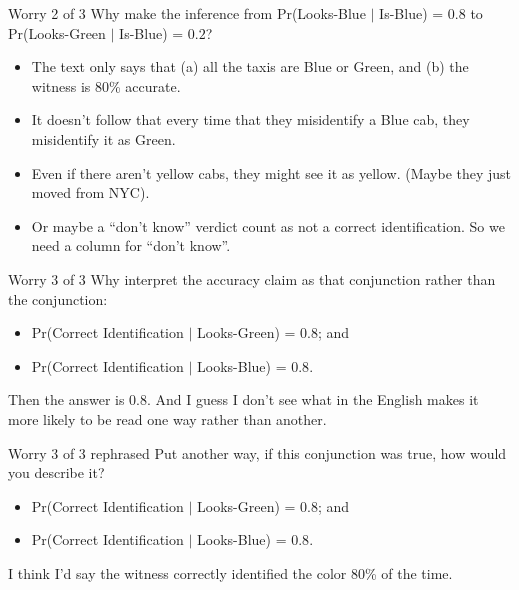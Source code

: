 \documentclass[
  ignorenonframetext,
]{beamer}
\providecommand{\tightlist}{%
  \setlength{\itemsep}{0pt}\setlength{\parskip}{0pt}}
\renewcommand{\,}{\text{, }}
\begin{document}
\begin{frame}{Worry 2 of 3}
\protect\hypertarget{worry-2-of-3}{}
Why make the inference from Pr(Looks-Blue \(|\) Is-Blue) = \(0.8\) to
Pr(Looks-Green \(|\) Is-Blue) = \(0.2\)? \pause

\begin{itemize}
\tightlist
\item
  The text only says that (a) all the taxis are Blue or Green, and (b)
  the witness is 80\% accurate.
\item
  It doesn't follow that every time that they misidentify a Blue cab,
  they misidentify it as Green. \pause
\item
  Even if there aren't yellow cabs, they might see it as yellow. (Maybe
  they just moved from NYC). \pause
\item
  Or maybe a ``don't know'' verdict count as not a correct
  identification. So we need a column for ``don't know''.
\end{itemize}
\end{frame}

\begin{frame}{Worry 3 of 3}
\protect\hypertarget{worry-3-of-3}{}
Why interpret the accuracy claim as that conjunction rather than the
conjunction:

\begin{itemize}
\tightlist
\item
  Pr(Correct Identification \(|\) Looks-Green) = \(0.8\); and
\item
  Pr(Correct Identification \(|\) Looks-Blue) = \(0.8\).
\end{itemize}

Then the answer is 0.8. And I guess I don't see what in the English
makes it more likely to be read one way rather than another.
\end{frame}

\begin{frame}{Worry 3 of 3 rephrased}
\protect\hypertarget{worry-3-of-3-rephrased}{}
Put another way, if this conjunction was true, how would you describe
it?

\begin{itemize}
\tightlist
\item
  Pr(Correct Identification \(|\) Looks-Green) = \(0.8\); and
\item
  Pr(Correct Identification \(|\) Looks-Blue) = \(0.8\). \pause
\end{itemize}

I think I'd say the witness correctly identified the color 80\% of the
time.
\end{frame}
\end{document}
